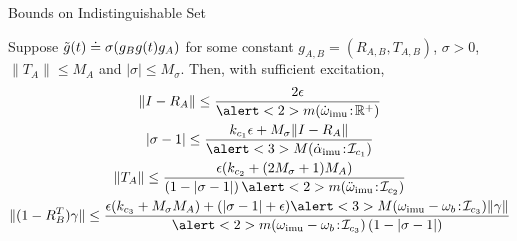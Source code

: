 \begin{tframe}{Bounds on Indistinguishable Set}
\begin{claim}[continued]
Suppose $\tilde{g}(t) \doteq \sigma(g_B g(t) g_A)$ for some  constant $g_{A,B} = (R_{A,B}, T_{A,B})$, $\sigma > 0$,
$\|T_A\|\leq M_A$ and $|\sigma|\leq M_\sigma$.
Then, with sufficient excitation,
\begin{gather*}
\| I - R_A \|  \leq  \frac{2{\epsilon}}{\alert<2>{\m(\dot{\w}\imu\!:\!{\RR^+})}}  \label{constraint1}\\
|\sigma - 1|  \le \frac{k_{c_1}\epsilon + M_\sigma\|I-R_A\|}{\alert<3>{\M(\dot\alpha\imu\!:\!{\I_{c_1}})}} \label{constraint2}\\
\|T_A\|\leq \frac{\epsilon(k_{c_2}+(2M_\sigma+1)M_A)}{(1-|\sigma-1|)\,\alert<2>{\m(\ddot\w\imu\!:\!{\I_{c_2}})}}\label{constraint3} \\
\|(1-R_B^T)\gamma\|\leq\frac{\epsilon(k_{c_3} + M_\sigma M_A) + (|\sigma-1|+\epsilon)\alert<3>{\M(\w\imu-\w_b\!:\!\I_{c_3})}\|\gamma\|}
{\alert<2>{\m(\w\imu-\w_b\!:\!\I_{c_3})}\,(1-|\sigma-1|)}\label{constraint4}
\end{gather*}
\end{claim}
\end{tframe}


